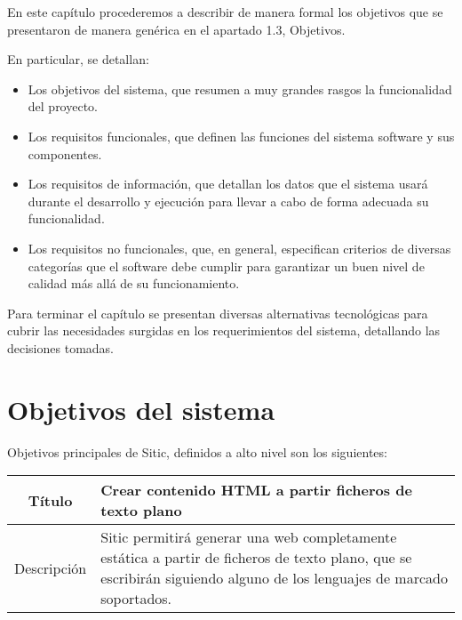 En este capítulo procederemos a describir de manera formal los objetivos que se
presentaron de manera genérica en el apartado 1.3, Objetivos.

En particular, se detallan:

\begin{itemize}
\item Los objetivos del sistema, que resumen a muy grandes rasgos la funcionalidad del proyecto.
\item Los requisitos funcionales, que definen las funciones del sistema software
y sus componentes.
\item Los requisitos de información, que detallan los datos que el sistema usará
durante el desarrollo y ejecución para llevar a cabo de forma adecuada su
funcionalidad.
\item Los requisitos no funcionales, que, en general, especifican criterios de diversas
categorías que el software debe cumplir para garantizar un buen nivel
de calidad más allá de su funcionamiento.
\end{itemize}

Para terminar el capítulo se presentan diversas alternativas tecnológicas para cubrir
las necesidades surgidas en los requerimientos del sistema, detallando las
decisiones tomadas.


\section{Objetivos del sistema}

Objetivos principales de Sitic, definidos a alto nivel son los siguientes:

\begin{center}

    \begin{tabularx}{\textwidth}{|c|X|}
        \hline
        Título & Crear contenido HTML a partir ficheros de texto plano\\

        \hline

        Descripción & Sitic permitirá generar una web completamente estática a partir
        de ficheros de texto plano, que se escribirán siguiendo alguno de los lenguajes de
        marcado soportados. \\

        \hline
    \end{tabularx}
\end{center}

